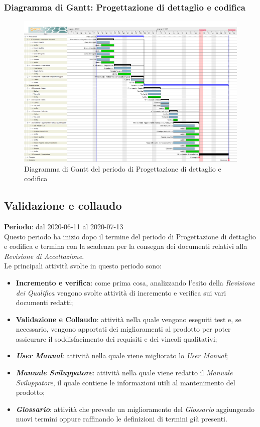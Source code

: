 	\subsubsection{Diagramma di Gantt: Progettazione di dettaglio e codifica}
		\begin{figure}[h]
			\centering
			\includegraphics[width=1.1\textwidth]{./res/img/DiagrammiGantt/prog_dett_gantt.png}
			\caption{Diagramma di Gantt del periodo di Progettazione di dettaglio e codifica}
		\end{figure}
\newpage
\subsection{Validazione e collaudo}
\textbf{Periodo}: dal 2020-06-11 al 2020-07-13 \\
Questo periodo ha inizio dopo il termine del periodo di Progettazione di dettaglio e codifica e termina con la scadenza per la consegna dei documenti relativi alla \textit{Revisione di Accettazione}. \\
Le principali attività svolte in questo periodo sono:
\begin{itemize}
	\item \textbf{Incremento e verifica}: come prima cosa, analizzando l'esito della \textit{Revisione dei Qualifica} vengono svolte attività di incremento e verifica sui vari documenti redatti;
	\item \textbf{Validazione e Collaudo}: attività nella quale vengono eseguiti test e, se necessario, vengono apportati dei miglioramenti al prodotto per poter assicurare il soddisfacimento dei requisiti e dei vincoli qualitativi;
	\item \textbf{\textit{User Manual}}: attività nella quale viene migliorato lo \textit{User Manual};
	\item \textbf{\textit{Manuale Sviluppatore}}: attività nella quale viene redatto il \textit{Manuale Sviluppatore}, il quale contiene le informazioni utili al mantenimento del prodotto;
	\item \textbf{\textit{Glossario}}: attività che prevede un miglioramento del \textit{Glossario} aggiungendo nuovi termini oppure raffinando le definizioni di termini già presenti.
\end{itemize}

